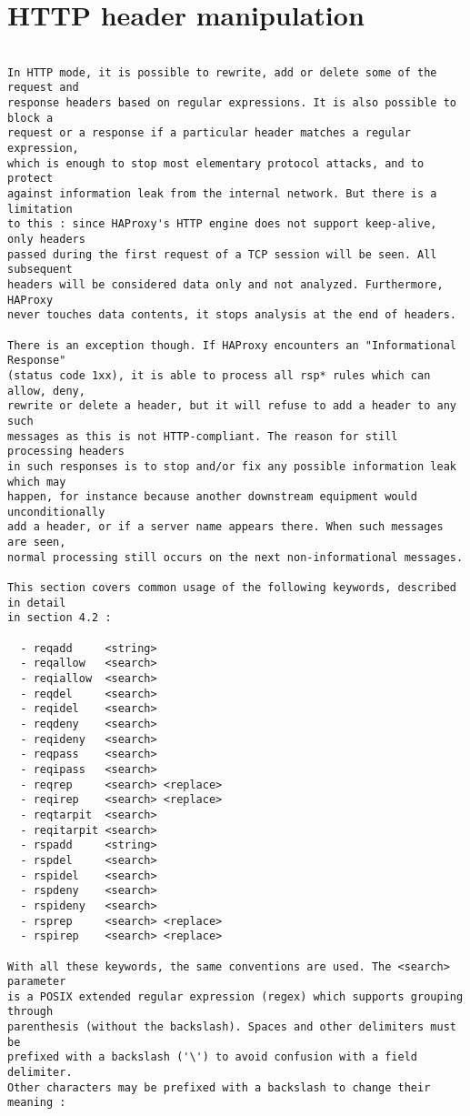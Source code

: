 
\chapter{HTTP header manipulation}

\begin{verbatim}

In HTTP mode, it is possible to rewrite, add or delete some of the request and
response headers based on regular expressions. It is also possible to block a
request or a response if a particular header matches a regular expression,
which is enough to stop most elementary protocol attacks, and to protect
against information leak from the internal network. But there is a limitation
to this : since HAProxy's HTTP engine does not support keep-alive, only headers
passed during the first request of a TCP session will be seen. All subsequent
headers will be considered data only and not analyzed. Furthermore, HAProxy
never touches data contents, it stops analysis at the end of headers.

There is an exception though. If HAProxy encounters an "Informational Response"
(status code 1xx), it is able to process all rsp* rules which can allow, deny,
rewrite or delete a header, but it will refuse to add a header to any such
messages as this is not HTTP-compliant. The reason for still processing headers
in such responses is to stop and/or fix any possible information leak which may
happen, for instance because another downstream equipment would unconditionally
add a header, or if a server name appears there. When such messages are seen,
normal processing still occurs on the next non-informational messages.

This section covers common usage of the following keywords, described in detail
in section 4.2 :

  - reqadd     <string>
  - reqallow   <search>
  - reqiallow  <search>
  - reqdel     <search>
  - reqidel    <search>
  - reqdeny    <search>
  - reqideny   <search>
  - reqpass    <search>
  - reqipass   <search>
  - reqrep     <search> <replace>
  - reqirep    <search> <replace>
  - reqtarpit  <search>
  - reqitarpit <search>
  - rspadd     <string>
  - rspdel     <search>
  - rspidel    <search>
  - rspdeny    <search>
  - rspideny   <search>
  - rsprep     <search> <replace>
  - rspirep    <search> <replace>

With all these keywords, the same conventions are used. The <search> parameter
is a POSIX extended regular expression (regex) which supports grouping through
parenthesis (without the backslash). Spaces and other delimiters must be
prefixed with a backslash ('\') to avoid confusion with a field delimiter.
Other characters may be prefixed with a backslash to change their meaning :


\end{verbatim}
